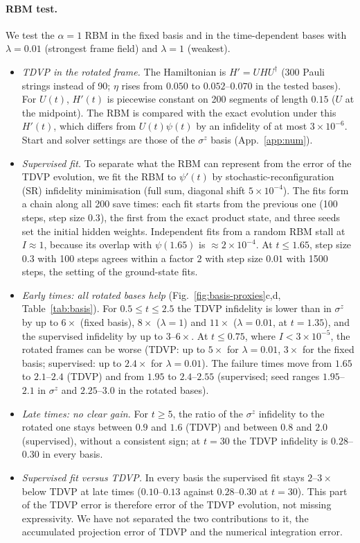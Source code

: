 \documentclass[11pt,a4paper]{article}
\newcommand{\inff}{I}
\begin{document}
\paragraph{RBM test.} We test the $\alpha=1$ RBM in the fixed basis and in the time-dependent bases with $\lambda=0.01$
(strongest frame field) and $\lambda=1$ (weakest).
\begin{itemize}
  \item \emph{TDVP in the rotated frame.} The Hamiltonian is $H'=UHU^\dagger$ (300 Pauli strings instead of 90; $\eta$
    rises from $0.050$ to $0.052$--$0.070$ in the tested bases). For $U(t)$, $H'(t)$ is piecewise constant on 200 segments of length $0.15$
    ($U$ at the midpoint). The RBM is compared with the exact evolution under this $H'(t)$, which differs from
    $U(t)\psi(t)$ by an infidelity of at most $3\times10^{-6}$. Start and solver settings are those of the $\sigma^z$
    basis (App.~\ref{app:num}).
  \item \emph{Supervised fit.} To separate what the RBM can represent from the error of the TDVP evolution, we fit the
    RBM to $\psi'(t)$ by stochastic-reconfiguration (SR) infidelity minimisation (full sum, diagonal shift $5\times10^{-4}$).
    The fits form a chain along all 200 save times: each fit starts from the previous one (100 steps, step size $0.3$),
    the first from the exact product state, and three seeds set the initial hidden weights. Independent fits from a
    random RBM stall at $\inff\approx1$, because its overlap with $\psi(1.65)$ is $\approx2\times10^{-4}$. At $t\le1.65$,
    step size $0.3$ with 100 steps agrees within a factor $2$ with step size $0.01$ with 1500 steps, the setting of the
    ground-state fits.
  \item \emph{Early times: all rotated bases help} (Fig.~\ref{fig:basis-proxies}c,d, Table~\ref{tab:basis}). For
    $0.5\le t\le2.5$ the TDVP infidelity is lower than in $\sigma^z$ by up to $6\times$ (fixed basis), $8\times$
    ($\lambda=1$) and $11\times$ ($\lambda=0.01$, at $t=1.35$), and the supervised infidelity by up to $3$--$6\times$. At
    $t\le0.75$, where $\inff<3\times10^{-5}$, the rotated frames can be worse (TDVP: up to $5\times$ for
    $\lambda=0.01$, $3\times$ for the fixed basis; supervised: up to $2.4\times$ for $\lambda=0.01$). The failure times move
    from $1.65$ to $2.1$--$2.4$ (TDVP) and from $1.95$ to $2.4$--$2.55$ (supervised; seed ranges $1.95$--$2.1$ in
    $\sigma^z$ and $2.25$--$3.0$ in the rotated bases).
  \item \emph{Late times: no clear gain.} For $t\ge5$, the ratio of the $\sigma^z$ infidelity to the rotated one stays
    between $0.9$ and $1.6$ (TDVP) and between $0.8$ and $2.0$ (supervised), without a consistent sign; at $t=30$ the
    TDVP infidelity is $0.28$--$0.30$ in every basis.
  \item \emph{Supervised fit versus TDVP.} In every basis the supervised fit stays $2$--$3\times$ below TDVP at late
    times ($0.10$--$0.13$ against $0.28$--$0.30$ at $t=30$). This part of the TDVP error is therefore error of the TDVP
    evolution, not missing expressivity. We have not separated the two contributions to it, the accumulated projection
    error of TDVP and the numerical integration error.
\end{itemize}
\end{document}

